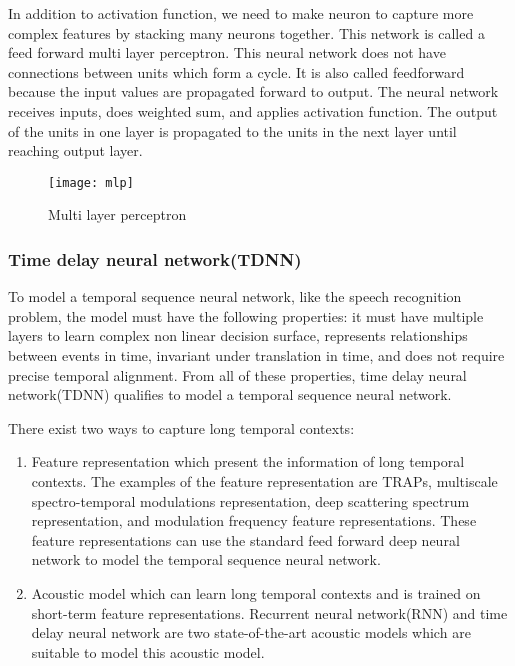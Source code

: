 In addition to activation function, we need to make neuron to capture more complex features by stacking many neurons together. This network is called a feed forward multi layer perceptron. This neural network does not have connections between units which form a cycle. It is also called feedforward because the input values are propagated forward to output. The neural network receives inputs, does weighted sum, and applies activation function. The output of the units in one layer is propagated to the units in the next layer until reaching output layer. 

\begin{figure}[H]
\caption{Multi layer perceptron}
\texttt{[image: mlp]}
\centering
\end{figure}

\subsubsection{Time delay neural network(TDNN)}
To model a temporal sequence neural network, like the speech recognition problem, the model must have the following properties: it must have multiple layers to learn complex non linear decision surface, represents relationships between events in time, invariant under translation in time, and does not require precise temporal alignment. From all of these properties, time delay neural network(TDNN) qualifies to model a temporal sequence neural network.

There exist two ways to capture long temporal contexts:
\begin{enumerate}
\item Feature representation which present the information of long temporal contexts. The examples of the feature representation are TRAPs\cite{Hermansky99temporalpatterns}, multiscale spectro-temporal modulations representation\cite{Mesgarani04speechdiscrimination}, deep scattering spectrum representation\cite{Anden2014}, and modulation frequency feature representations\cite{Thomas2009}. These feature representations can use the standard feed forward deep neural network to model the temporal sequence neural network.

\item Acoustic model which can learn long temporal contexts and is trained on short-term feature representations. Recurrent neural network(RNN) \cite{1402.1128} and time delay neural network \cite{Waibel:1990:PRU:108235.108263} are two state-of-the-art acoustic models which are suitable to model this acoustic model. 
\end{enumerate}

